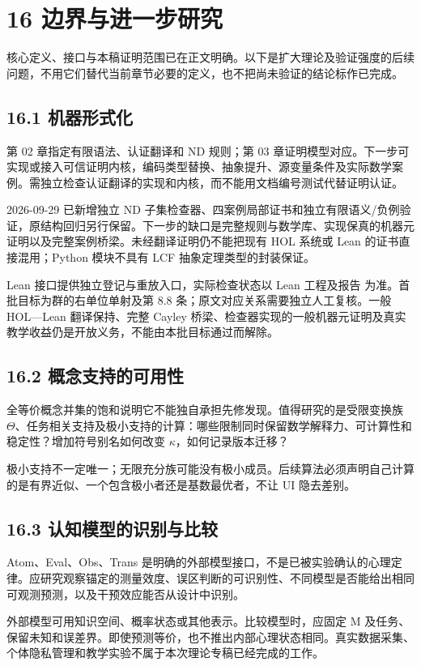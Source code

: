 \documentclass[UTF8,a4paper,zihao=-4,fontset=windows,openany]{ctexbook}
\newcommand{\mcsorigin}[1]{\par\noindent{\small\color{black!55}#1}\par\addvspace{0.8em}}
\begin{document}
\clearpage\chapter{16 边界与进一步研究}
\mcsorigin{原章节：16-开放问题.md}
核心定义、接口与本稿证明范围已在正文明确。以下是扩大理论及验证强度的后续问题，不用它们替代当前章节必要的定义，也不把尚未验证的结论标作已完成。

\section{16.1 机器形式化}
第 02 章指定有限语法、认证翻译和 ND 规则；第 03 章证明模型对应。下一步可实现或接入可信证明内核，编码类型替换、抽象提升、源变量条件及实际数学案例。需独立检查认证翻译的实现和内核，而不能用文档编号测试代替证明认证。

2026-09-29 已新增独立 ND 子集检查器、四案例局部证书和独立有限语义/负例验证，原结构回归另行保留。下一步的缺口是完整规则与数学库、实现保真的机器元证明以及完整案例桥梁。未经翻译证明仍不能把现有 HOL 系统或 Lean 的证书直接混用；Python 模块不具有 LCF 抽象定理类型的封装保证。

Lean 接口提供独立登记与重放入口，实际检查状态以 Lean 工程及报告 为准。首批目标为群的右单位单射及第 8.8 条；原文对应关系需要独立人工复核。一般 HOL—Lean 翻译保持、完整 Cayley 桥梁、检查器实现的一般机器元证明及真实教学收益仍是开放义务，不能由本批目标通过而解除。

\section{16.2 概念支持的可用性}
全等价概念并集的饱和说明它不能独自承担先修发现。值得研究的是受限变换族 \(\Theta\)、任务相关支持及极小支持的计算：哪些限制同时保留数学解释力、可计算性和稳定性？增加符号别名如何改变 \(\kappa\)，如何记录版本迁移？

极小支持不一定唯一；无限充分族可能没有极小成员。后续算法必须声明自己计算的是有界近似、一个包含极小者还是基数最优者，不让 UI 隐去差别。

\section{16.3 认知模型的识别与比较}
Atom、Eval、Obs、Trans 是明确的外部模型接口，不是已被实验确认的心理定律。应研究观察锚定的测量效度、误区判断的可识别性、不同模型是否能给出相同可观测预测，以及干预效应能否从设计中识别。

外部模型可用知识空间、概率状态或其他表示。比较模型时，应固定 M 及任务、保留未知和误差界。即使预测等价，也不推出内部心理状态相同。真实数据采集、个体隐私管理和教学实验不属于本次理论专稿已经完成的工作。
\end{document}
